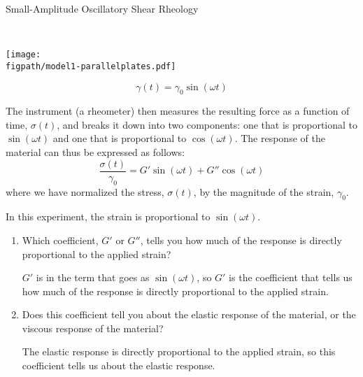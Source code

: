 \begin{activity}[extension]{Small-Amplitude Oscillatory Shear Rheology}
\begin{model}
	\vspace{0.1in}
	\begin{minipage}{0.15\textwidth}
	~
	\end{minipage}
	\begin{minipage}{0.35\textwidth}
		\centerline{\texttt{[image: \\figpath/model1-parallelplates.pdf]}}
	\end{minipage}
	\begin{minipage}{0.4\textwidth}
		\begin{equation*}
			\gamma(t) = \gamma_0 \sin(\omega t)
		\end{equation*}
	\end{minipage}
	\vspace{0.1in}
	
	The instrument (a rheometer) then measures the resulting force as a function of time, $\sigma(t)$, and breaks it down into two components: one that is proportional to $\sin(\omega t)$ and one that is proportional to $\cos(\omega t)$. The response of the material can thus be expressed as follows:
	\begin{equation*}
		\frac{\sigma(t)}{\gamma_0} = G' \sin(\omega t) + G'' \cos(\omega t)
	\end{equation*}
	where we have normalized the stress, $\sigma(t)$, by the magnitude of the strain, $\gamma_0$.

\end{model}

\begin{ctqs}
		
		\question In this experiment, the strain is proportional to $\sin(\omega t)$.  
			\begin{enumerate}
				\item Which coefficient, $G'$ or $G''$, tells you how much of the response is directly proportional to the applied strain?
	
					\begin{solution}[1.1in]
						$G'$ is in the term that goes as $\sin(\omega t)$, so $G'$ is the coefficient that tells us how much of the response is directly proportional to the applied strain.
					\end{solution}
		
		\item Does this coefficient tell you about the elastic response of the material, or the viscous response of the material?
	
					\begin{solution}[1.1in]
						The elastic response is directly proportional to the applied strain, so this coefficient tells us about the elastic response.
					\end{solution}
					

\end{enumerate}
\end{ctqs}
\end{activity}
